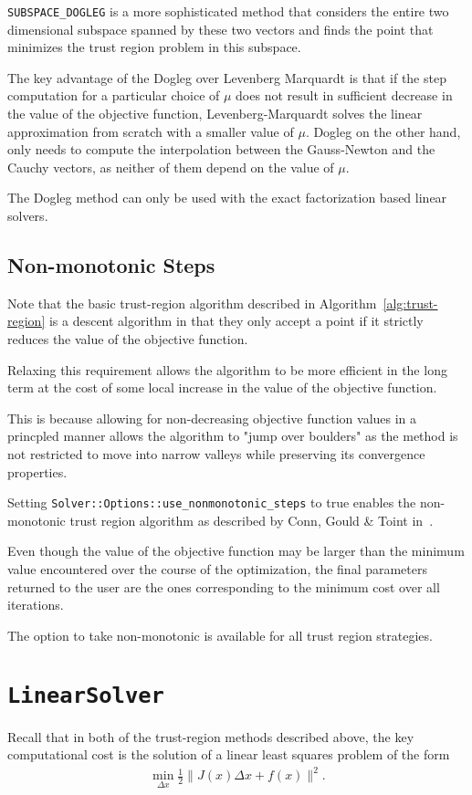  \texttt{SUBSPACE\_DOGLEG} is a more sophisticated method
that considers the entire two dimensional subspace spanned by these
two vectors and finds the point that minimizes the trust region
problem in this subspace\cite{byrd1988approximate}.

The key advantage of the Dogleg over Levenberg Marquardt is that if the step computation for a particular choice of $\mu$ does not result in sufficient decrease in the value of the objective function, Levenberg-Marquardt solves the linear approximation from scratch with a smaller value of $\mu$. Dogleg on the other hand, only needs to compute the interpolation between the Gauss-Newton and the Cauchy vectors, as neither of them depend on the value of $\mu$.

The Dogleg method can only be used with the exact factorization based linear solvers.

\subsection{Non-monotonic Steps}
Note that the basic trust-region algorithm described in
Algorithm~\ref{alg:trust-region} is a descent algorithm  in that
    they only accept a point if it strictly reduces the value of
     the objective function.

     Relaxing this requirement allows the algorithm to be more
     efficient in the long term at the cost of some local increase
     in the value of the objective function.

     This is because allowing for non-decreasing objective function
     values in a princpled manner allows the algorithm to "jump over
     boulders" as the method is not restricted to move into narrow
     valleys while preserving its convergence properties.

     Setting \texttt{Solver::Options::use\_nonmonotonic\_steps} to true enables the
     non-monotonic trust region algorithm as described by
Conn,  Gould \& Toint in~\cite{conn2000trust}.

     Even though the value of the objective function may be larger
     than the minimum value encountered over the course of the
     optimization, the final parameters returned to the user are the
     ones corresponding to the minimum cost over all iterations.

    The option to take non-monotonic is available for all trust region
strategies.

\section{\texttt{LinearSolver}}
Recall that in both of the trust-region methods described above, the key computational cost is the solution of a linear least squares problem of the form
\begin{align}
 \min_{\Delta x} \frac{1}{2} \|J(x)\Delta x + f(x)\|^2 .
 \label{eq:simple2}
\end{align}


